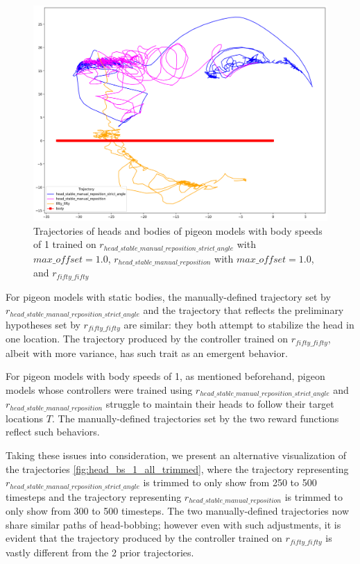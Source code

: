   \begin{figure}[H]
      \centering
      \includegraphics[width=1\textwidth]{figures/head_tracking_results/pigeon_bs_1_all.png}
      \caption{Trajectories of heads and bodies of pigeon models with body speeds of 1 trained on $r_{head\_stable\_manual\_reposition\_strict\_angle}$ with $max\_offset = 1.0$, $r_{head\_stable\_manual\_reposition}$ with $max\_offset = 1.0$, and $r_{fifty\_fifty}$}
      \label{fig:head_bs_1_all}
  \end{figure}

  For pigeon models with static bodies, the manually-defined trajectory set by $r_{head\_stable\_manual\_reposition\_strict\_angle}$ and the trajectory that reflects the preliminary hypotheses set by $r_{fifty\_fifty}$ are similar: they both attempt to stabilize the head in one location. The trajectory produced by the controller trained on $r_{fifty\_fifty}$, albeit with more variance, has such trait as an emergent behavior.

  For pigeon models with body speeds of 1, as mentioned beforehand, pigeon models whose controllers were trained using $r_{head\_stable\_manual\_reposition\_strict\_angle}$ and $r_{head\_stable\_manual\_reposition}$ struggle to maintain their heads to follow their target locations $T$.
  The manually-defined trajectories set by the two reward functions reflect such behaviors.

  Taking these issues into consideration, we present an alternative visualization of the trajectories \ref{fig:head_bs_1_all_trimmed}, where the trajectory representing $r_{head\_stable\_manual\_reposition\_strict\_angle}$ is trimmed to only show from 250 to 500 timesteps and the trajectory representing $r_{head\_stable\_manual\_reposition}$ is trimmed to only show from 300 to 500 timesteps.
  The two manually-defined trajectories now share similar paths of head-bobbing; however even with such adjustments, it is evident that the trajectory produced by the controller trained on $r_{fifty\_fifty}$ is vastly different from the 2 prior trajectories.

